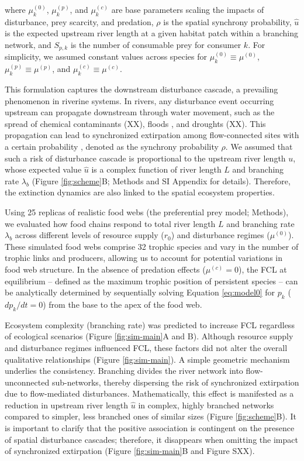 \documentclass[11pt, class=article, crop=false]{standalone}
\begin{document}
where $\mu_k^{(0)}$, $\mu_k^{(p)}$, and $\mu_k^{(c)}$ are base parameters scaling the impacts of disturbance, prey scarcity, and predation, $\rho$ is the spatial synchrony probability, $\hat{u}$ is the expected upstream river length at a given habitat patch within a branching network, and $S_{p, k}$ is the number of consumable prey for consumer $k$.
For simplicity, we assumed constant values across species for $\mu_k^{(0)} \equiv \mu^{(0)}$, $\mu_k^{(p)} \equiv \mu^{(p)}$, and $\mu_k^{(c)} \equiv \mu^{(c)}$.

This formulation captures the downstream disturbance cascade, a prevailing phenomenon in riverine systems.
In rivers, any disturbance event occurring upstream can propagate downstream through water movement, such as the spread of chemical contaminants (XX), floods \citep{swanson_flood_1998, nakamura_disturbance_2000}, and droughts (XX).
This propagation can lead to synchronized extirpation among flow-connected sites with a certain probability \citep{larsen_geography_2021, sarremejane_drought_2021}, denoted as the synchrony probability $\rho$. 
We assumed that such a risk of disturbance cascade is proportional to the upstream river length $u$, whose expected value $\hat{u}$ is a complex function of river length $L$ and branching rate $\lambda_b$ (Figure \ref{fig:scheme}B; Methods and SI Appendix for details).
Therefore, the extinction dynamics are also linked to the spatial ecosystem properties.

Using 25 replicas of realistic food webs (the preferential prey model; Methods), we evaluated how food chains respond to total river length $L$ and branching rate $\lambda_b$ across different levels of resource supply ($r_0$) and disturbance regimes ($\mu^{(0)}$).
These simulated food webs comprise 32 trophic species and vary in the number of trophic links and producers, allowing us to account for potential variations in food web structure.
In the absence of predation effects ($\mu^{(c)} = 0$), the FCL at equilibrium -- defined as the maximum trophic position of persistent species -- can be analytically determined by sequentially solving Equation \ref{eq:model0} for $p_k$ ($dp_k/dt = 0$) from the base to the apex of the food web. 

Ecosystem complexity (branching rate) was predicted to increase FCL regardless of ecological scenarios (Figure \ref{fig:sim-main}A and B).
Although resource supply and disturbance regimes influenced FCL, these factors did not alter the overall qualitative relationships (Figure \ref{fig:sim-main}).
A simple geometric mechanism underlies the consistency.
Branching divides the river network into flow-unconnected sub-networks, thereby dispersing the risk of synchronized extirpation due to flow-mediated disturbances.
Mathematically, this effect is manifested as a reduction in upstream river length $\hat{u}$ in complex, highly branched networks compared to simpler, less branched ones of similar sizes (Figure \ref{fig:scheme}B).
It is important to clarify that the positive association is contingent on the presence of spatial disturbance cascades; therefore, it disappears when omitting the impact of synchronized extirpation (Figure \ref{fig:sim-main}B and Figure SXX).
\end{document}
